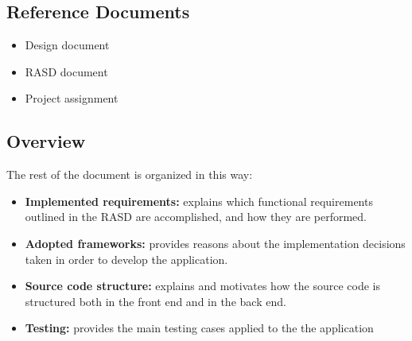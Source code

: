 \subsection{Reference Documents}
\begin{itemize}
	\item Design document
	\item RASD document
	\item Project assignment
\end{itemize}

\subsection{Overview}
The rest of the document is organized in this way:
\begin{itemize}
	
	\item \textbf{Implemented requirements:} explains which functional requirements outlined in the RASD are accomplished, and how they are performed.
	\item \textbf{Adopted frameworks:} provides reasons about the implementation decisions taken in order to develop the application.
	\item \textbf{Source code structure:} explains and motivates how the source code is structured both in the front end and in the back end.
	\item \textbf{Testing:} provides the main testing cases applied to the the application
	
\end{itemize} 
